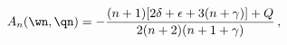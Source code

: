 \begin{equation}
A_n(\wn,\qn) = - {(n+1)[2\delta +\epsilon + 3(n+\gamma )]
+ Q\over 2(n+2)(n+1+\gamma)}\,,
\label{adef}
\end{equation}


